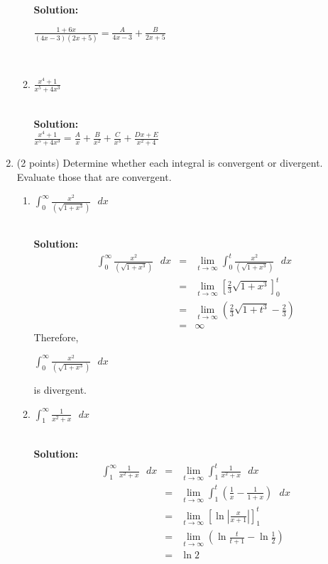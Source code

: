 \documentclass[paper=a4, fontsize=11pt]{scrartcl} %
\numberwithin{equation}{section} %
\numberwithin{figure}{section} %
\numberwithin{table}{section} %
\begin{document}
\begin{enumerate}
\begin{enumerate}
\noindent\textbf{Solution:}\\
\begin{large}$\frac{1+6x}{(4x-3)(2x+5)}=\frac{A}{4x-3}+\frac{B}{2x+5}$\end{large}\\
\vspace{.25in}
\item \begin{large}$\frac{x^4+1}{x^5+4x^3}$\end{large}\\

\noindent\textbf{Solution:}\\
$\frac{x^4+1}{x^5+4x^3}=\frac{A}{x}+\frac{B}{x^2}+\frac{C}{x^3}+\frac{Dx+E}{x^2+4}$\\
\end{enumerate}
\vspace{.25in}

\item (2 points) Determine whether each integral is convergent or divergent.  Evaluate those that are convergent.
\begin{enumerate}
\item \begin{large}$\int_0^\infty \frac{x^2}{(\sqrt{1+x^3})} \text { } dx$\end{large}\\

\noindent\textbf{Solution:}\\
\begin{eqnarray*}
\int_0^\infty \frac{x^2}{(\sqrt{1+x^3})} \text { } dx&=& \lim_{t \rightarrow \infty} \int_0^t \frac{x^2}{(\sqrt{1+x^3})}\text { } dx\\
&=& \lim_{t \rightarrow \infty} \left[ \frac{2}{3} \sqrt{1+x^3} \right]_0^t \\
&=& \lim_{t \rightarrow \infty} \left(\frac{2}{3} \sqrt{1+t^3} -\frac{2}{3} \right) \\
&=& \infty
\end{eqnarray*}
Therefore,  \begin{large}$\int_0^\infty \frac{x^2}{(\sqrt{1+x^3})} \text { } dx$\end{large} is divergent.

\item \begin{large}$\int_1^\infty \frac{1}{x^2+x}\text { } dx$\end{large}\\

\noindent\textbf{Solution:}\\
\begin{eqnarray*}
\int_1^\infty \frac{1}{x^2+x}\text { } dx &=& \lim_{t \rightarrow \infty} \int_1^t \frac{1}{x^2+x}\text { } dx\\
&=& \lim_{t \rightarrow \infty} \int_1^t \left(\frac{1}{x} - \frac{1}{1+x}\right)\text { } dx \\
&=& \lim_{t \rightarrow \infty} \left[ \ln | \frac{x}{x+1} | \right]_1^t \\
&=& \lim_{t \rightarrow \infty} \left( \ln \frac{t}{t+1} - \ln \frac{1}{2} \right) \\
&=& \ln 2
\end{eqnarray*}


\end{enumerate}
\end{enumerate}
\end{document}
